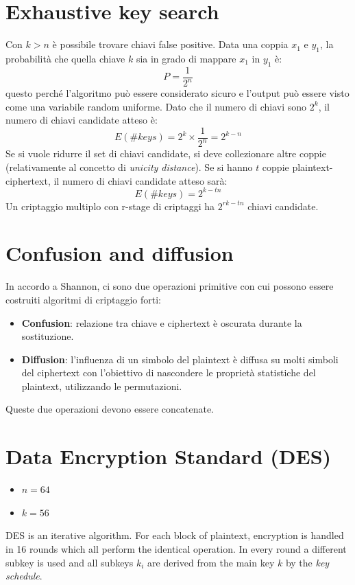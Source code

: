 \documentclass[a4paper,12pt]{article}
\begin{document}
\section{Exhaustive key search}
Con $k > n$ è possibile trovare chiavi false positive. Data una coppia $x_1$ e $y_1$, la probabilità che quella chiave $k$ sia in grado di mappare $x_1$ in $y_1$ è:
$$ P = \frac{1}{2^n} $$
questo perché l'algoritmo può essere considerato sicuro e l'output può essere visto come una variabile random uniforme.
Dato che il numero di chiavi sono $2^k$, il numero di chiavi candidate atteso è: 
$$ E(\#keys) = 2^k \times \frac{1}{2^n} = 2^{k-n}$$
Se si vuole ridurre il set di chiavi candidate, si deve collezionare altre coppie (relativamente al concetto di \textit{unicity distance}). Se si hanno $t$ coppie plaintext-ciphertext, il numero di chiavi candidate atteso sarà:
$$ E(\#keys) = 2^{k-tn} $$
Un criptaggio multiplo con r-stage di criptaggi ha $2^{rk-tn}$ chiavi candidate.

\section{Confusion and diffusion}
In accordo a Shannon, ci sono due operazioni primitive con cui possono essere costruiti algoritmi di criptaggio forti:
\begin{itemize}							
	\item \textbf{Confusion}: relazione tra chiave e ciphertext è oscurata durante la sostituzione.
	\item \textbf{Diffusion}: l'influenza di un simbolo del plaintext è diffusa su molti simboli del ciphertext con l'obiettivo di nascondere le proprietà statistiche del plaintext, utilizzando le permutazioni.
\end{itemize}
Queste due operazioni devono essere concatenate.

\section{Data Encryption Standard (DES)}
\begin{itemize}
	\item $n = 64$
	\item $k = 56$
\end{itemize}
DES is an iterative algorithm. For each block of plaintext, encryption is handled in 16 rounds which all perform the identical operation. In every round a different subkey is used and all subkeys $k_i$ are derived from the main key $k$ by the \textit{key schedule}.
\end{document}
